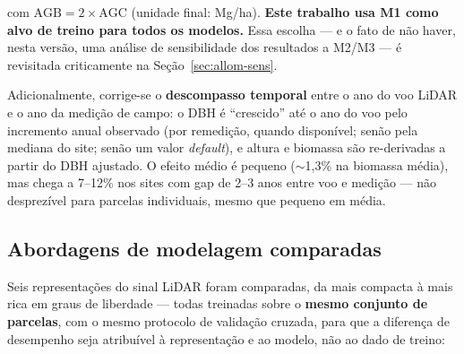 com $\text{AGB} = 2 \times \text{AGC}$ (unidade final: Mg/ha). \textbf{Este
trabalho usa M1 como alvo de treino para todos os modelos.} Essa escolha --- e o
fato de não haver, nesta versão, uma análise de sensibilidade dos resultados a
M2/M3 --- é revisitada criticamente na Seção~\ref{sec:allom-sens}.

Adicionalmente, corrige-se o \textbf{descompasso temporal} entre o ano do voo
LiDAR e o ano da medição de campo: o DBH é ``crescido'' até o ano do voo pelo
incremento anual observado (por remedição, quando disponível; senão pela mediana
do site; senão um valor \textit{default}), e altura e biomassa são re-derivadas a
partir do DBH ajustado. O efeito médio é pequeno ($\sim$1,3\% na biomassa média),
mas chega a 7--12\% nos sites com gap de 2--3 anos entre voo e medição --- não
desprezível para parcelas individuais, mesmo que pequeno em média.

\subsection{Abordagens de modelagem comparadas}

Seis representações do sinal LiDAR foram comparadas, da mais compacta à mais rica
em graus de liberdade --- todas treinadas sobre o \textbf{mesmo conjunto de
parcelas}, com o mesmo protocolo de validação cruzada, para que a diferença de
desempenho seja atribuível à representação e ao modelo, não ao dado de treino:

